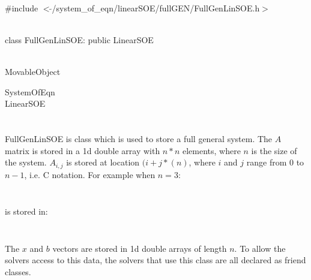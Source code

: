 
   \\
\#include $<\tilde{ }$/system\_of\_eqn/linearSOE/fullGEN/FullGenLinSOE.h$>$  


  \\
class FullGenLinSOE: public LinearSOE 


 \\
MovableObject 

\indent\indent SystemOfEqn \\
\indent\indent\indent LinearSOE \\
\indent\indent\indent{} \\

  \\
\indent FullGenLinSOE is class which is used to store a full general
system. The $A$ matrix is stored in a 1d double array with $n*n$
elements, where $n$ is the size of the system. $A_{i,j}$ is stored at
location $(i + j*(n)$, where $i$ and $j$ range from $0$ to $n-1$,
i.e. C notation. For example when $n=3$: 


$$

$$


$$

$$


is stored in:


$$

$$


$$

$$


The $x$ and $b$ vectors are stored in 1d double arrays of length
$n$. To allow the solvers access to this data, the solvers that use
this class are all declared as friend classes. \\

